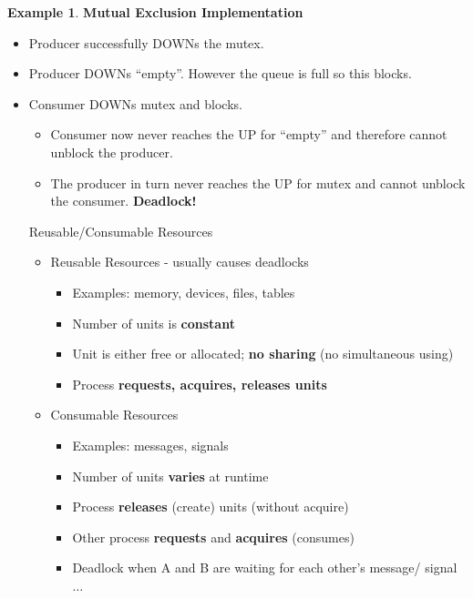 \documentclass[12pt,a4paper]{article}
\theoremstyle{definition}
\newtheorem{example}{Example}[section]
\newenvironment{myitemize}
{ \begin{itemize}
    \setlength{\itemsep}{5pt}
    \setlength{\parskip}{0pt}
    \setlength{\parsep}{0pt}     }
{ \end{itemize}                  }
\begin{document}
\begin{example}{\textbf{Mutual Exclusion Implementation}}
\begin{myitemize}
\begin{myitemize}
\begin{tcolorbox}
				\centering
			\end{tcolorbox}
			\item Producer successfully DOWNs the mutex.
			\item Producer DOWNs “empty”. However the queue is full so this blocks.
			\item Consumer DOWNs mutex and blocks.
			\begin{myitemize}
				\item Consumer now never reaches the UP for “empty” and therefore cannot unblock the producer.
				\item The producer in turn never reaches the UP for mutex and cannot unblock the consumer. \textbf{Deadlock!}
			\end{myitemize}
			\begin{tcolorbox}
				\textsf{Reusable/Consumable Resources}
				\begin{myitemize}
					\item Reusable Resources - usually causes deadlocks
					\begin{myitemize}
						\item Examples: memory, devices, files, tables 
						\item Number of units is \textbf{constant}
						\item Unit is either free or allocated; \textbf{no sharing} (no simultaneous using) 
						\item Process \textbf{requests, acquires, releases units}
					\end{myitemize}
					\item Consumable Resources
					\begin{myitemize}
						\item Examples: messages, signals
						\item Number of units \textbf{varies} at runtime 
						\item Process \textbf{releases} (create) units (without acquire) 
						\item Other process \textbf{requests} and \textbf{acquires} (consumes)
						\item Deadlock when A and B are waiting for each other's message/ signal $\dots$
					\end{myitemize}
				\end{myitemize}
			\end{tcolorbox}
		\end{myitemize}
	\end{myitemize}
\end{example}
\end{document}

